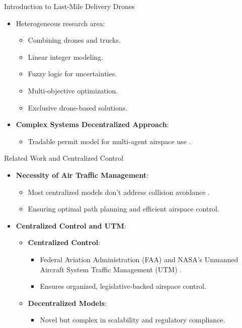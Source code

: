 \begin{frame}{Introduction to Last-Mile Delivery Drones}
\begin{itemize}
    \item Heterogeneous research area:
    \begin{itemize}
        \item Combining drones and trucks.
        \item Linear integer modeling.
        \item Fuzzy logic for uncertainties.
        \item Multi-objective optimization.
        \item Exclusive drone-based solutions.
    \end{itemize}
    \item \textbf{Complex Systems Decentralized Approach}:
    \begin{itemize}
        \item Tradable permit model for multi-agent airspace use \cite{Verri}.
    \end{itemize}
\end{itemize}

\end{frame}

\begin{frame}{Related Work and Centralized Control}
\begin{itemize}
    \item \textbf{Necessity of Air Traffic Management}:
    \begin{itemize}
        \item Most centralized models don't address collision avoidance \cite{DUKKANCI2023}.
        \item Ensuring optimal path planning and efficient airspace control.
    \end{itemize}
    \item \textbf{Centralized Control and UTM}:
    \begin{itemize}
        \item \textbf{Centralized Control}:
        \begin{itemize}
            \item Federal Aviation Administration (FAA) and NASA's Unmanned Aircraft System Traffic Management (UTM) \cite{nasa}.
            \item Ensures organized, legislative-backed airspace control.
        \end{itemize}
        \item \textbf{Decentralized Models}:
        \begin{itemize}
            \item Novel but complex in scalability and regulatory compliance.
        \end{itemize}
    \end{itemize}
\end{itemize}
\end{frame}



